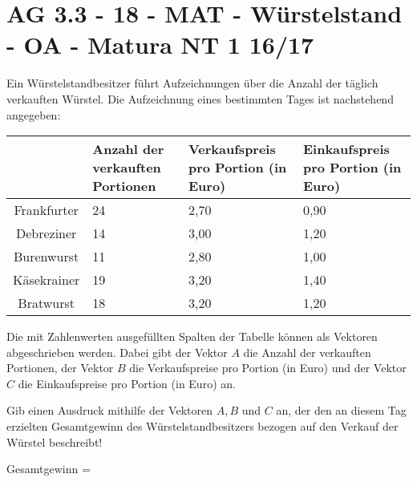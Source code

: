 \section{AG 3.3 - 18 - MAT - Würstelstand - OA - Matura NT 1 16/17}

\begin{beispiel}[AG 3.3]{1} %
Ein Würstelstandbesitzer führt Aufzeichnungen über die Anzahl der täglich verkauften Würstel. Die Aufzeichnung eines bestimmten Tages ist nachstehend angegeben:

\begin{tabular}{|c|C{3.5cm}|C{3.5cm}|C{3.5cm}|}
&Anzahl der verkauften Portionen&Verkaufspreis pro Portion (in Euro)&Einkaufspreis pro Portion (in Euro)\\ \hline
{}Frankfurter&24&2,70& 0,90\\ \hline
{}Debreziner&14&3,00& 1,20\\ \hline
{}Burenwurst&11&2,80& 1,00\\ \hline
{}Käsekrainer&19&3,20& 1,40\\ \hline
{}Bratwurst&18&3,20& 1,20\\ \hline
\end{tabular}

Die mit Zahlenwerten ausgefüllten Spalten der Tabelle können als Vektoren abgeschrieben werden. Dabei gibt der Vektor $A$ die Anzahl der verkauften Portionen, der Vektor $B$ die Verkaufspreise pro Portion (in Euro) und der Vektor $C$ die Einkaufspreise pro Portion (in Euro) an.

Gib einen Ausdruck mithilfe der Vektoren $A,B$ und $C$ an, der den an diesem Tag erzielten Gesamtgewinn des Würstelstandbesitzers bezogen auf den Verkauf der Würstel beschreibt!

Gesamtgewinn = 
\end{beispiel}